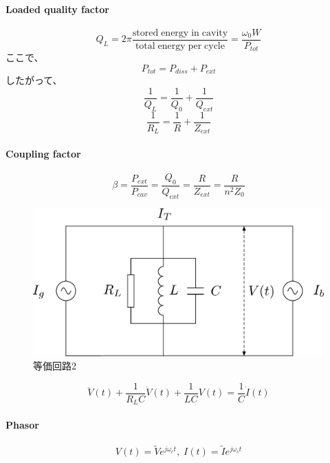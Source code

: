 \documentclass[book]{jlreq}
\begin{document}
\paragraph{Loaded quality factor}
%
\begin{equation}
    Q_L = 2\pi \frac{\mathrm{stored\;energy\;in\;cavity}}{\mathrm{total \; energy\;per\;cycle}} = \frac{\omega_0 W}{P_{tot}}
\end{equation}
%
ここで、
%
\begin{equation}
    P_{tot} = P_{diss} + P_{ext}
\end{equation}
%
したがって、
%
\begin{equation}
    \frac{1}{Q_L} = \frac{1}{Q_0} + \frac{1}{Q_{ext}}
\end{equation}
%
\begin{equation}
    \frac{1}{R_L} = \frac{1}{R} + \frac{1}{Z_{ext}}
\end{equation}
%
\paragraph{Coupling factor \beta}
%
\begin{equation}
    \beta = \frac{P_{ext}}{P_{cav}} = \frac{Q_0}{Q_{ext}} = \frac{R}{Z_{ext}} = \frac{R}{n^2 Z_0}
\end{equation}
%
\begin{figure}[hbt]
    \begin{center}
      \includegraphics[width=12cm,clip]{figs/Equivalent_Circuit2}
      \caption{等価回路2}
     \label{Equivalent_Circuit2}
    \end{center}
\end{figure}
%
\begin{equation}
    \ddot{V}(t) + \frac{1}{R_L C}\dot{V}(t) + \frac{1}{L C} V(t) = \frac{1}{C} \dot{I}(t)
\end{equation}
%
\paragraph{Phasor}
\begin{equation}
    V(t) = \tilde{V}e^{j\omega_c t}, \; I(t) = \tilde{I}e^{j\omega_c t}
\end{equation}
\end{document}
